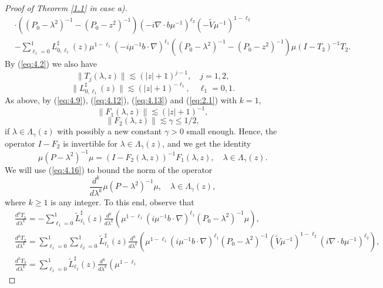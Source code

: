 \documentclass[11pt]{amsart}
\numberwithin{equation}{section}
\begin{document}
\begin{proof}[Proof of Theorem \ref{1.1} in case a)]
\begin{align*}
 &\cdot ((P_0-\lambda^2)^{-1}-(P_0-z^2)^{-1})(-i\nabla\cdot b\mu^{-1})^{\ell_2}(-\widetilde V\mu^{-1})^{1-\ell_2}\\
&-\sum_{\ell_1=0}^1L^\sharp_{0, \ell_1}(z)\mu^{1-\ell_1}(-i\mu^{-1}b\cdot\nabla)^{\ell_1}
((P_0-\lambda^2)^{-1}-(P_0-z^2)^{-1})\mu(I-T_3)^{-1}T_2.
\end{align*}
 By (\ref{eq:4.2}) we also have
\begin{equation}\label{eq:4.12}
\|T_j(\lambda,z)\|\lesssim (|z|+1)^{j-1},\quad j=1,2,
\end{equation}
\begin{equation}\label{eq:4.13}
\|L_{0, \ell_1}^\sharp(z)\|\lesssim (|z|+1)^{-\ell_1},\quad \ell_1=0,1.
\end{equation}
As above, by (\ref{eq:4.9}), (\ref{eq:4.12}), (\ref{eq:4.13}) and (\ref{eq:2.1}) with $k=1$,
\begin{equation}\label{eq:4.14}
\|F_1(\lambda,z)\|\lesssim (|z|+1)^{-1},
\end{equation}
\begin{equation}\label{eq:4.15}
\|F_2(\lambda,z)\|\lesssim \gamma\le 1/2,
\end{equation}
if $\lambda\in\Lambda_\gamma(z)$ with possibly a new constant $\gamma>0$ small enough.
Hence, the operator $I-F_2$
is invertible for $\lambda\in\Lambda_\gamma(z)$, and we get the identity
\begin{equation}\label{eq:4.16}
\mu(P-\lambda^2)^{-1}\mu=(I-F_2(\lambda,z))^{-1}F_1(\lambda,z),\quad \lambda\in\Lambda_\gamma(z).
\end{equation}
We will use (\ref{eq:4.16}) to bound the norm of the operator
\begin{equation*}
\frac{d^k}{d\lambda^k}\mu(P-\lambda^2)^{-1}\mu,\quad \lambda\in\Lambda_\gamma(z),
\end{equation*}
where $k\ge 1$ is any integer. To this end, observe that
\begin{align*}
& \frac{d^kT_1}{d\lambda^k}= -\sum_{\ell_1=0}^1 \widetilde L^\sharp_{\ell_1}(z)\frac{d^k}{d\lambda^k}\left(\mu^{1-\ell_1}
(i\mu^{-1}b\cdot\nabla)^{\ell_1}(P_0 - \lambda^2)^{-1}\mu\right),\\
&\frac{d^kT_2}{d\lambda^k}=\sum_{\ell_1=0}^1\sum_{\ell_2=0}^1\widetilde L^\sharp_{\ell_1}(z)\frac{d^k}{d\lambda^k}\left(\mu^{1-\ell_1}(i\mu^{-1}b\cdot\nabla)^{\ell_1}(P_0-\lambda^2)^{-1}
(\widetilde V\mu^{-1})^{1-\ell_2}(i\nabla\cdot b\mu^{-1})^{\ell_2}\right),\\
& \frac{d^kT_3}{d\lambda^k}=\sum_{\ell_1=0}^1\widetilde L^\sharp_{\ell_1}(z)\frac{d^k}{d\lambda^k}\left(\mu^{1-\ell_1}

\end{align*}
\end{proof}
\end{document}
